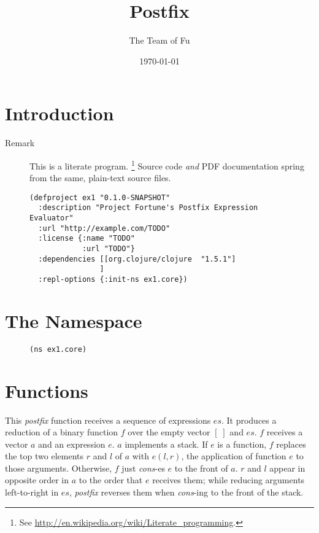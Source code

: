 \documentclass[11pt]{article}
\author{The Team of Fu}
\date{\today}
\title{Postfix}
\begin{document}
\maketitle
\tableofcontents


\section{Introduction}
\label{sec-1}
\begin{description}
\item[{Remark}] This is a literate program.
\footnote{See \url{http://en.wikipedia.org/wiki/Literate_programming}.}
Source code \emph{and} PDF documentation spring
from the same, plain-text source files.
\end{description}

\begin{figure}[H]
\label{project-file}
\begin{verbatim}
(defproject ex1 "0.1.0-SNAPSHOT"
  :description "Project Fortune's Postfix Expression Evaluator"
  :url "http://example.com/TODO"
  :license {:name "TODO"
            :url "TODO"}
  :dependencies [[org.clojure/clojure  "1.5.1"]
                ]
  :repl-options {:init-ns ex1.core})
\end{verbatim}
\end{figure}
\section{The Namespace}
\label{sec-2}

\begin{figure}[H]
\label{main-namespace}
\begin{verbatim}
(ns ex1.core)
\end{verbatim}
\end{figure}
\section{Functions}
\label{sec-3}

This \emph{postfix} function receives a sequence of expressions $es$. It
produces a reduction of a binary function $f$ over the empty vector
$[\;]$ and $es$. $f$ receives a vector $a$ and an expression $e$. $a$
implements a stack. If $e$ is a function, $f$ replaces the top two
elements $r$ and $l$ of $a$ with $e(l,r)$, the application of function
$e$ to those arguments. Otherwise, $f$ just \emph{cons}-es $e$ to the front
of $a$. $r$ and $l$ appear in opposite order in $a$ to the order that
$e$ receives them; while reducing arguments left-to-right in $es$,
\emph{postfix} reverses them when \emph{cons}-ing to the front of the stack.
\end{document}
